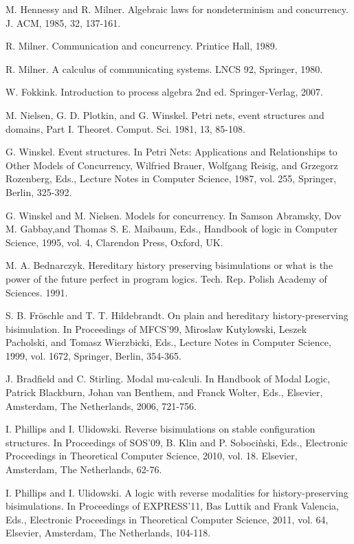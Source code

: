 \begin{thebibliography}{Lam94}

M. Hennessy and R. Milner. Algebraic laws for nondeterminism and concurrency. J. ACM, 1985, 32, 137-161.

R. Milner. Communication and concurrency. Printice Hall, 1989.

 R. Milner. A calculus of communicating systems. LNCS 92, Springer, 1980.

 W. Fokkink. Introduction to process algebra 2nd ed. Springer-Verlag, 2007.

M. Nielsen, G. D. Plotkin, and G. Winskel. Petri nets, event structures and domains, Part I. Theoret. Comput. Sci. 1981, 13, 85-108.

G. Winskel. Event structures. In Petri Nets: Applications and Relationships to Other Models of Concurrency, Wilfried Brauer, Wolfgang Reisig, and Grzegorz Rozenberg, Eds., Lecture Notes in Computer Science, 1987, vol. 255, Springer, Berlin, 325-392.

G. Winskel and M. Nielsen. Models for concurrency. In Samson Abramsky, Dov M. Gabbay,and  Thomas S. E. Maibaum, Eds., Handbook of logic in Computer Science, 1995, vol. 4, Clarendon Press, Oxford, UK.

M. A. Bednarczyk. Hereditary history preserving bisimulations or what is the power of the future perfect in program logics. Tech. Rep. Polish Academy of Sciences. 1991.

S. B. Fr\"{o}schle and T. T. Hildebrandt. On plain and hereditary history-preserving bisimulation. In Proceedings of MFCS'99, Miroslaw Kutylowski, Leszek Pacholski, and Tomasz Wierzbicki, Eds., Lecture Notes in Computer Science, 1999, vol. 1672, Springer, Berlin, 354-365.

J. Bradfield and C. Stirling. Modal mu-calculi. In Handbook of Modal Logic, Patrick Blackburn, Johan van Benthem, and Franck Wolter, Eds., Elsevier, Amsterdam, The Netherlands, 2006, 721-756.

I. Phillips and I. Ulidowski. Reverse bisimulations on stable configuration structures. In Proceedings of SOS'09, B. Klin and P. Soboci\`{n}ski, Eds., Electronic Proceedings in Theoretical Computer Science, 2010, vol. 18. Elsevier, Amsterdam, The Netherlands, 62-76.

I. Phillips and I. Ulidowski. A logic with reverse modalities for history-preserving bisimulations. In Proceedings of EXPRESS'11, Bas Luttik and Frank Valencia, Eds., Electronic Proceedings in Theoretical Computer Science, 2011, vol. 64, Elsevier, Amsterdam, The Netherlands, 104-118.


\end{thebibliography}
